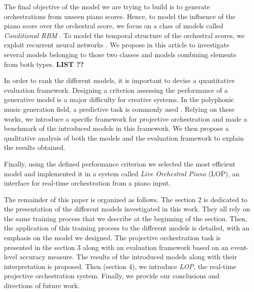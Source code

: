 \documentclass{article}
\begin{document}
The final objective of the model we are trying to build is to generate orchestrations from unseen piano scores.
Hence, to model the influence of the piano score over the orchestral score, we focus on a class of models called \textit{Conditional RBM} \cite{taylor2006modeling}. To model the temporal structure of the orchestral scores, we exploit recurrent neural networks \cite{sutskever2013training}. We propose in this article to investigate several models belonging to those two classes and models combining elements from both types. \textbf{LIST ??}

In order to rank the different models, it is important to devise a quantitative evaluation framework. Designing a criterion assessing the performance of a generative model is a major difficulty for creative systems. In the polyphonic music generation field, a predictive task is commonly used \cite{boulanger2012modeling,lavrenko2003polyphonic,DBLP:journals/corr/YaoCVDD15}. Relying on these works, we introduce a specific framework for projective orchestration and made a benchmark of the introduced models in this framework. We then propose a qualitative analysis of both the models and the evaluation framework to explain the results obtained.

Finally, using the defined performance criterion we selected the most efficient model and implemented it in a system called \textit{Live Orchestral Piano} (LOP), an interface for real-time orchestration from a piano input.

The remainder of this paper is organized as follows. The section 2 is dedicated to the presentation of the different models investigated in this work. 
They all rely on the same training process that we describe at the beginning of the section. Then, the application of this training process to the different models is detailed, with an emphasis on the model we designed.
The projective orchestration task is presented in the section 3 along with an evaluation framework based on an event-level accuracy measure. The results of the introduced models along with their interpretation is proposed. Then (section 4), we introduce \textit{LOP}, the real-time projective orchestration system. Finally, we provide our conclusions and directions of future work.
\end{document}

